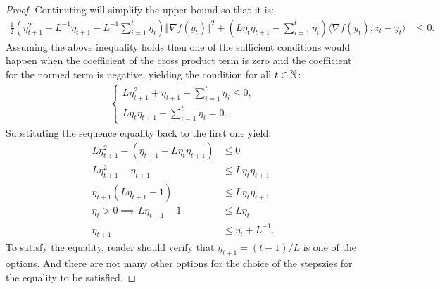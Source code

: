 \documentclass[12pt]{article}
\begin{document}
\begin{proof}
            Continuting will simplify the upper bound so that it is: 
            \begin{align*}
                \frac{1}{2}\left(
                    \eta_{t + 1}^2 - L^{-1}\eta_{t +1} - L^{-1}\sum_{i = 1}^{t}\eta_i
                \right)\Vert \nabla f(y_t)\Vert^2
                + 
                \left(
                    L\eta_t \eta_{t + 1} - \sum_{i = 1}^{t} \eta_i
                \right)
                \langle \nabla f(y_t), z_t - y_t\rangle 
                &
                \le 0. 
            \end{align*}
            Assuming the above inequality holds then one of the sufficient conditions would happen when the coefficient of the cross product term is zero and the coefficient for the normed term is negative, yielding the condition for all $t \in \mathbb N$: 
            \begin{align*}
                \begin{cases}
                    L\eta_{t + 1}^2 + \eta_{t + 1} - \sum_{i = 1}^{t}\eta_i 
                    \le 0, 
                    \\
                    L\eta_t \eta_{t + 1} - \sum_{i = 1}^{t} \eta_i 
                    = 0. 
                \end{cases}
            \end{align*}
            Substituting the sequence equality back to the first one yield: 
            \begin{align*}
                L\eta_{t + 1}^2 - (\eta_{t + 1} + L\eta_t\eta_{t + 1}) &\le 0 
                \\
                L\eta^2_{t + 1} - \eta_{t + 1}
                &\le 
                L\eta_t \eta_{t + 1} 
                \\
                \eta_{t + 1}(L\eta_{t + 1} - 1) 
                &\le L\eta_t\eta_{t + 1}
                \\
                \eta_t > 0 
                \implies 
                L\eta_{t + 1} - 1 &\le 
                L\eta_t 
                \\
                \eta_{t + 1} &\le \eta_t + L^{-1}. 
            \end{align*}
            To satisfy the equality, reader should verify that $\eta_{t + 1} = (t - 1)/ L$ is one of the options. 
            And there are not many other options for the choice of the stepszies for the equality to be satisfied. 
        \end{proof}
\end{document}
